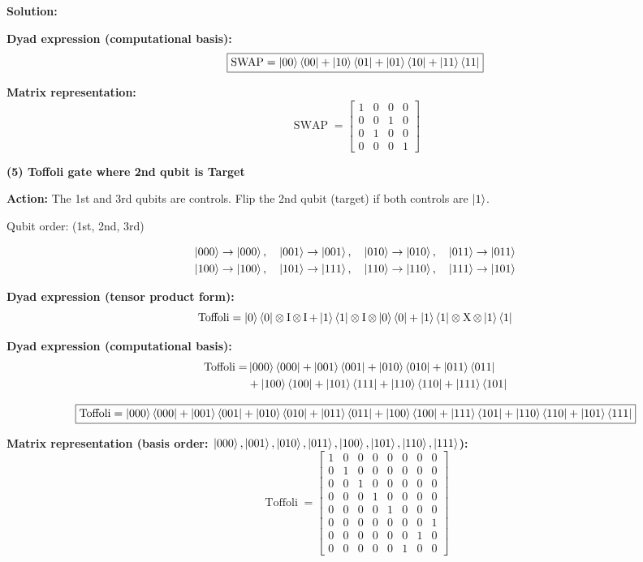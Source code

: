 \documentclass[11pt]{article}
\newenvironment{solution}
{\par\noindent\textbf{Solution:}\par}
{\vspace{1em}}
\begin{document}
\begin{solution}
\textbf{Dyad expression (computational basis):}
\[\boxed{\operatorname{SWAP} = \ket{00}\bra{00} + \ket{10}\bra{01} + \ket{01}\bra{10} + \ket{11}\bra{11}}\]

\textbf{Matrix representation:}
\[\boxed{\operatorname{SWAP} = \begin{bmatrix}1 & 0 & 0 & 0 \\ 0 & 0 & 1 & 0 \\ 0 & 1 & 0 & 0 \\ 0 & 0 & 0 & 1\end{bmatrix}}\]

\textbf{(5) Toffoli gate where 2nd qubit is Target}

\textbf{Action:} The 1st and 3rd qubits are controls. Flip the 2nd qubit (target) if both controls are $\ket{1}$.

Qubit order: (1st, 2nd, 3rd)

\[\begin{aligned}
\ket{000} &\to \ket{000}, \quad \ket{001} \to \ket{001}, \quad \ket{010} \to \ket{010}, \quad \ket{011} \to \ket{011} \\
\ket{100} &\to \ket{100}, \quad \ket{101} \to \ket{111}, \quad \ket{110} \to \ket{110}, \quad \ket{111} \to \ket{101}
\end{aligned}\]

\textbf{Dyad expression (tensor product form):}
\[\operatorname{Toffoli} = \ket{0}\bra{0} \otimes \operatorname{I} \otimes \operatorname{I} + \ket{1}\bra{1} \otimes \operatorname{I} \otimes \ket{0}\bra{0} + \ket{1}\bra{1} \otimes \operatorname{X} \otimes \ket{1}\bra{1}\]

\textbf{Dyad expression (computational basis):}
\[\begin{aligned}
\operatorname{Toffoli} = &\ket{000}\bra{000} + \ket{001}\bra{001} + \ket{010}\bra{010} + \ket{011}\bra{011} \\
&+ \ket{100}\bra{100} + \ket{101}\bra{111} + \ket{110}\bra{110} + \ket{111}\bra{101}
\end{aligned}\]

\[\boxed{\operatorname{Toffoli} = \ket{000}\bra{000} + \ket{001}\bra{001} + \ket{010}\bra{010} + \ket{011}\bra{011} + \ket{100}\bra{100} + \ket{111}\bra{101} + \ket{110}\bra{110} + \ket{101}\bra{111}}\]

\textbf{Matrix representation (basis order: $\ket{000}, \ket{001}, \ket{010}, \ket{011}, \ket{100}, \ket{101}, \ket{110}, \ket{111}$):}
\[\boxed{\operatorname{Toffoli} = \begin{bmatrix}
1 & 0 & 0 & 0 & 0 & 0 & 0 & 0 \\
0 & 1 & 0 & 0 & 0 & 0 & 0 & 0 \\
0 & 0 & 1 & 0 & 0 & 0 & 0 & 0 \\
0 & 0 & 0 & 1 & 0 & 0 & 0 & 0 \\
0 & 0 & 0 & 0 & 1 & 0 & 0 & 0 \\
0 & 0 & 0 & 0 & 0 & 0 & 0 & 1 \\
0 & 0 & 0 & 0 & 0 & 0 & 1 & 0 \\
0 & 0 & 0 & 0 & 0 & 1 & 0 & 0
\end{bmatrix}}\]

\end{solution}
\end{document}
